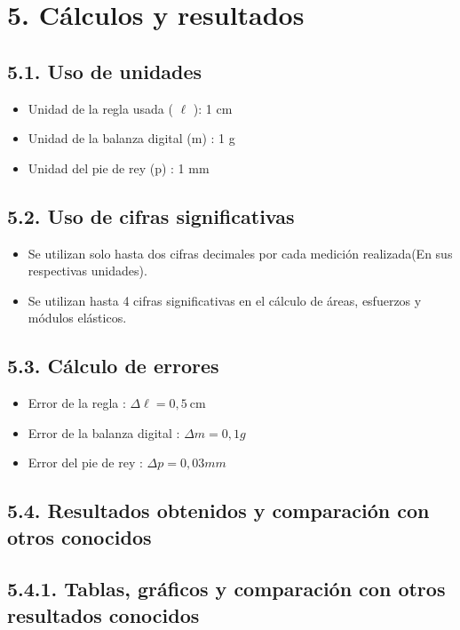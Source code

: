\section{5. Cálculos y resultados}
\subsection{5.1. Uso de unidades}
\begin{itemize}
  \item Unidad de la regla usada ( $\ell$ ): 1 cm
  \item Unidad de la balanza digital (m) : 1 g
  \item Unidad del pie de rey (p) : 1 mm
\end{itemize}

\subsection{5.2. Uso de cifras significativas}
\begin{itemize}
  \item Se utilizan solo hasta dos cifras decimales por cada medición realizada(En sus respectivas unidades).
  \item Se utilizan hasta 4 cifras significativas en el cálculo de áreas, esfuerzos y módulos elásticos.
\end{itemize}

\subsection{5.3. Cálculo de errores}
\begin{itemize}
  \item Error de la regla : $\Delta \ell=0,5 \mathrm{~cm}$
  \item Error de la balanza digital : $\Delta m=0,1 g$
  \item Error del pie de rey : $\Delta p=0,03 m m$
\end{itemize}

\subsection{5.4. Resultados obtenidos y comparación con otros conocidos}
\subsection{5.4.1. Tablas, gráficos y comparación con otros resultados conocidos}

